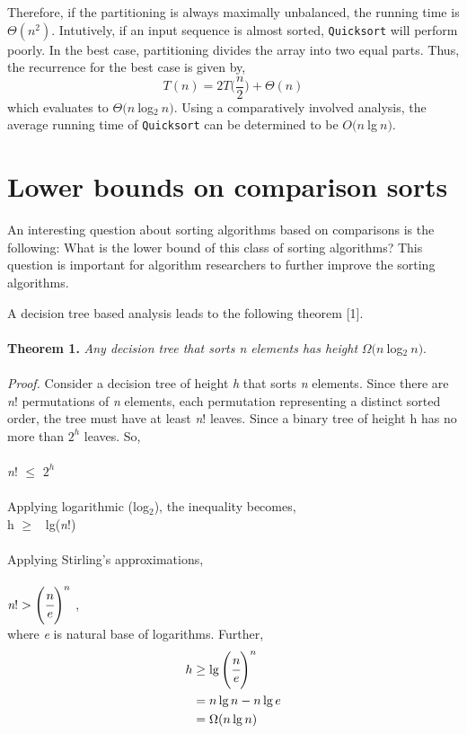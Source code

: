 \documentclass[a4paper, 10pt,twocolumn]{article}
\begin{document}
Therefore, if the partitioning is always maximally unbalanced, the running time is $\Theta(n^{2})$. Intutively, if an input sequence is almost sorted, \texttt{Quicksort} will perform poorly. In the best case, partitioning divides the array into two equal parts. Thus, the recurrence for the best case is given by,
\begin{equation*}
    T(n) = 2 T\Bigg(\frac{n}{2}\Bigg) + \Theta(n)
\end{equation*}
which evaluates to $\Theta(n \ $log$_{2} \ n)$. Using a comparatively involved analysis, the average running time of \texttt{Quicksort} can be determined to be $O(n \ $lg$ \ n)$.
\section{Lower bounds on comparison sorts}
An interesting question about sorting algorithms based on comparisons is the following: What is the lower bound of this class of sorting algorithms? This question is important for algorithm researchers to further improve the sorting algorithms.

A decision tree based analysis leads to the following theorem [1].\\ \\
\textbf{Theorem 1.} \textit{Any decision tree that sorts n elements has height} $\Omega(n \ $log$_{2} \ n)$. \\ \\
\textit{Proof.} Consider a decision tree of height \textit{h} that sorts \textit{n} elements. Since there are \textit{n}! permutations of \textit{n} elements, each permutation representing a distinct sorted order, the tree must have at least \textit{n}! leaves. Since a binary tree of height h has no more than $2^{h}$ leaves. So,\\ \\
\textit{n}! $\leq$ $2^{h}$ \\ \\
Applying logarithmic (log$_{2}$), the inequality becomes, \\ 
h $\geq$ \ lg(\textit{n}!) \\ \\
Applying Stirling's approximations,\\ \\
$\textit{n}! > \Bigg(\cfrac{n}{e}\Bigg)^{n}$ ,\\
where \textit{e} is natural base of logarithms. Further,
\begin{align*}
    h &\geq \lg \Bigg(\cfrac{n}{e}\Bigg)^n \\
    &=n \lg n - n\lg e \\
    &=\Omega(n \lg n)
\end{align*}\hfill\boxed{}
\end{document}
